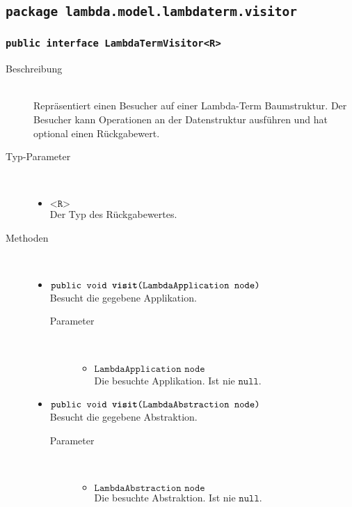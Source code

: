 \subsection{\texttt{package lambda.model.lambdaterm.visitor}}

\subsubsection{\normalfont \texttt{public interface \textbf{LambdaTermVisitor<R>}}}

\begin{description}
\item[Beschreibung] \hfill \\ Repräsentiert einen Besucher auf einer Lambda-Term Baumstruktur. Der Besucher kann Operationen an der Datenstruktur ausführen und hat optional einen Rückgabewert.

\item[Typ-Parameter] \hfill \\
	\vspace{-.8cm}
	\begin{itemize}
		\item $\texttt{<R>}$ \\ Der Typ des Rückgabewertes.
	\end{itemize}

\item[Methoden] \hfill \\
	\vspace{-.8cm}
	\begin{itemize}
		\item $\texttt{public void \textbf{visit}(LambdaApplication node)}$ \\ Besucht die gegebene Applikation.
		\begin{description}
			\item[Parameter] \hfill \\
			\vspace{-.8cm}
			\begin{itemize}
				\item $\texttt{LambdaApplication node}$ \\ Die besuchte Applikation. Ist nie $\texttt{null}$.
			\end{itemize}
		\end{description}
		
		\item $\texttt{public void \textbf{visit}(LambdaAbstraction node)}$ \\ Besucht die gegebene Abstraktion.
		\begin{description}
			\item[Parameter] \hfill \\
			\vspace{-.8cm}
			\begin{itemize}
				\item $\texttt{LambdaAbstraction node}$ \\ Die besuchte Abstraktion. Ist nie $\texttt{null}$.
			\end{itemize}
		\end{description}
		

\end{itemize}
\end{description}
